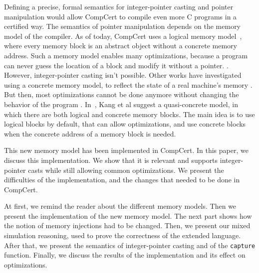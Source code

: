 Defining a precise, formal semantics for integer-pointer casting and pointer manipulation would allow CompCert to compile even more C programs in a certified way.
The semantics of pointer manipulation depends on the memory model of the compiler.
As of today, CompCert uses a logical memory model~\cite{leroy:hal-00703441}, where every memory block is an abstract object without a concrete memory address. Such a memory model enables many optimizations, because a program can never guess the location of a block and modify it without a pointer. .
However, integer-pointer casting isn't possible.
Other works have investigated using a concrete memory model, to reflect the state of a real machine's memory . But then, most optimizations cannot be done anymore without changing the behavior of the program .
In~\cite{DBLP:conf/pldi/KangHMGZV15}, Kang et al suggest a quasi-concrete model, in which there are both logical and concrete memory blocks. The main idea is to use logical blocks by default, that can allow optimizations, and use concrete blocks when the concrete address of a memory block is needed.

This new memory model has been implemented in CompCert.
In this paper, we discuss this implementation.
We show that it is relevant and supports integer-pointer casts while still allowing common optimizations.
We present the difficulties of the implementation, and the changes that needed to be done in CompCert.

At first, we remind the reader about the different memory models.
Then we present the implementation of the new memory model. The next part shows how the notion of memory injections had to be changed. Then, we present our mixed simulation reasoning, used to prove the correctness of the extended language. After that, we present the semantics of integer-pointer casting and of the \texttt{capture} function.
Finally, we discuss the results of the implementation and its effect on optimizations. 
